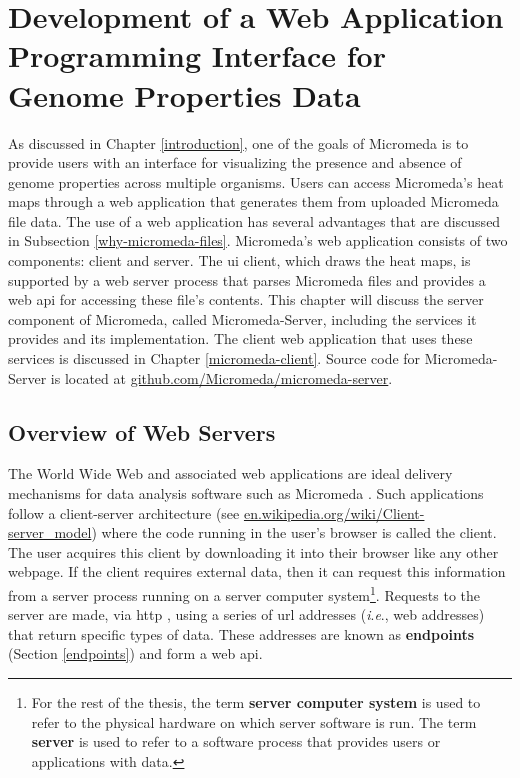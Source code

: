 \chapter{Development of a Web Application Programming Interface for Genome 
Properties Data} \label{micromeda-server}

As discussed in Chapter \ref{introduction}, one of the goals of Micromeda is to 
provide users with an interface for visualizing the presence and absence of 
genome properties across multiple organisms. Users can access Micromeda's heat 
maps through a web application that generates them from uploaded Micromeda file 
data. The use of a web application has several advantages that are discussed in 
Subsection \ref{why-micromeda-files}. Micromeda's web application consists of 
two components: client and server. The \gls{ui} client, which draws the heat 
maps, is supported by a web server process that parses Micromeda files and 
provides a web \gls{api} for accessing these file's contents. This chapter will 
discuss the server component of Micromeda, called Micromeda-Server, including 
the services it provides and its implementation. The client web application that 
uses these services is discussed in Chapter \ref{micromeda-client}. Source code 
for Micromeda-Server is located at 
\href{https://github.com/Micromeda/micromeda-server}{github.com/Micromeda/micromeda-server}.

\section{Overview of Web Servers} \label{web-servers}

The World Wide Web and associated web applications are ideal delivery mechanisms 
for data analysis software such as Micromeda \cite{berners1994world}. Such 
applications follow a client-server architecture \cite{svobodova1985client} (see 
\href{http://en.wikipedia.org/wiki/Client-server_model}{en.wikipedia.org/wiki/Client-server\_model}) 
where the code running in the user's browser is called the client. The user 
acquires this client by downloading it into their browser like any other 
webpage. If the client requires external data, then it can request this 
information from a server process running on a server computer 
system\footnote{For the rest of the thesis, the term \textbf{server computer 
system} is used to refer to the physical hardware on which server software is 
run. The term \textbf{server} is used to refer to a software process that 
provides users or applications with data.}. Requests to the server are made, via 
\gls{http} \cite{fielding1999hypertext}, using a series of \gls{url} addresses 
\cite{berners1994rfc} (\textit{i}.\textit{e}., web addresses) that return 
specific types of data. These addresses are known as \textbf{endpoints} (Section 
\ref{endpoints}) and form a web \gls{api}.

